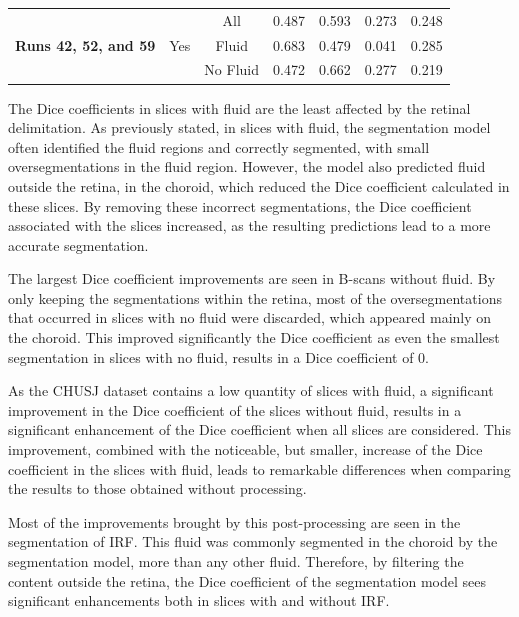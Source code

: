 \begin{table}[!ht]
\begin{tabular}{|c|c|c|c|c|c|c|}
		\hline
		
		\multirow{3}{*}{\parbox{2cm}{\textbf{Runs 42, 52, and 59}}} & \multirow{3}{*}{Yes} & All & 0.487 & 0.593 & 0.273 & 0.248 \\
		
		& & Fluid & 0.683 & 0.479 & 0.041 & 0.285 \\
		
		& & No Fluid & 0.472 & 0.662 & 0.277 & 0.219\\
		
		\hline
		
	\end{tabular}
	\label{tab:CHUSJProcessedSegmentationResults}
\end{table}

The Dice coefficients in slices with fluid are the least affected by the retinal delimitation. As previously stated, in slices with fluid, the segmentation model often identified the fluid regions and correctly segmented, with small oversegmentations in the fluid region. However, the model also predicted fluid outside the retina, in the choroid, which reduced the Dice coefficient calculated in these slices. By removing these incorrect segmentations, the Dice coefficient associated with the slices increased, as the resulting predictions lead to a more accurate segmentation.
\par
The largest Dice coefficient improvements are seen in B-scans without fluid. By only keeping the segmentations within the retina, most of the oversegmentations that occurred in slices with no fluid were discarded, which appeared mainly on the choroid. This improved significantly the Dice coefficient as even the smallest segmentation in slices with no fluid, results in a Dice coefficient of 0.
\par
As the CHUSJ dataset contains a low quantity of slices with fluid, a significant improvement in the Dice coefficient of the slices without fluid, results in a significant enhancement of the Dice coefficient when all slices are considered. This improvement, combined with the noticeable, but smaller, increase of the Dice coefficient in the slices with fluid, leads to remarkable differences when comparing the results to those obtained without processing.
\par
Most of the improvements brought by this post-processing are seen in the segmentation of IRF. This fluid was commonly segmented in the choroid by the segmentation model, more than any other fluid. Therefore, by filtering the content outside the retina, the Dice coefficient of the segmentation model sees significant enhancements both in slices with and without IRF. 
